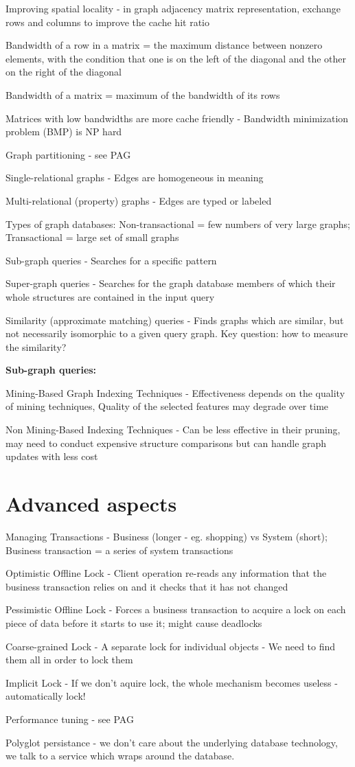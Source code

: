 Improving spatial locality - in graph adjacency matrix representation, exchange rows and columns to improve the cache hit ratio

Bandwidth of a row in a matrix = the maximum distance between nonzero elements, with the condition that one is on the left of the diagonal and the other on the right of the diagonal

Bandwidth of a matrix = maximum of the bandwidth of its rows

Matrices with low bandwidths are more cache friendly - Bandwidth minimization problem (BMP) is NP hard

Graph partitioning - see PAG

Single-relational graphs - Edges are homogeneous in meaning

Multi-relational (property) graphs - Edges are typed or labeled

Types of graph databases: Non-transactional = few numbers of very large graphs; Transactional = large set of small graphs 

Sub-graph queries - Searches for a specific pattern

Super-graph queries - Searches for the graph database members of which their whole structures are contained in the input query

Similarity (approximate matching) queries - Finds graphs which are similar, but not necessarily isomorphic to a given query graph. Key question: how to measure the similarity?

\textbf{Sub-graph queries:}

Mining-Based Graph Indexing Techniques - Effectiveness depends on the quality of mining techniques, Quality of the selected features may degrade over time

Non Mining-Based Indexing Techniques - Can be less effective in their pruning, may need to conduct expensive structure comparisons but can handle graph updates with less cost 

\section{Advanced aspects}

Managing Transactions - Business (longer - eg. shopping) vs System (short); Business transaction = a series of system transactions  

Optimistic Offline Lock - Client operation re-reads any information that the business transaction relies on and it checks that it has not changed

Pessimistic Offline Lock - Forces a business transaction to acquire a lock on each piece of data before it starts to use it; might cause deadlocks

Coarse-grained Lock - A separate lock for individual objects - We need to find them all in order to lock them  

Implicit Lock - If we don't aquire lock, the whole mechanism becomes useless - automatically lock!

Performance tuning - see PAG

Polyglot persistance - we don't care about the underlying database technology, we talk to a service which wraps around the database.
